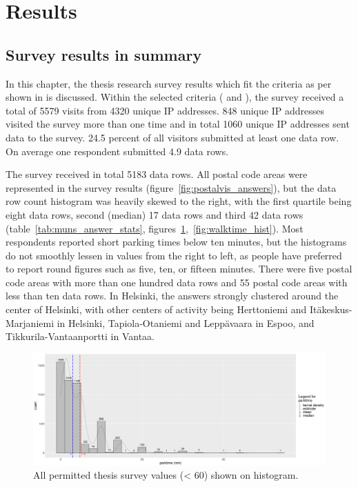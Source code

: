 \section{Results}
\subsection{Survey results in summary}
\justify

In this chapter, the thesis research survey results which fit the criteria as per shown in \hyperref[sec:processdata]{} is discussed. Within the selected criteria ( and ), the survey received a total of 5579 visits from 4320 unique IP addresses. 848 unique IP addresses visited the survey more than one time and in total 1060 unique IP addresses sent data to the survey. 24.5 percent of all visitors submitted at least one data row. On average one respondent submitted 4.9 data rows.

The survey received in total 5183 data rows. All postal code areas were represented in the survey results (figure~\ref{fig:postalvis_answers}), but the data row count histogram was heavily skewed to the right, with the first quartile being eight data rows, second (median) 17 data rows and third 42 data rows (table~\ref{tab:muns_answer_stats}, figures~\ref{fig:parktime_hist},~\ref{fig:walktime_hist}). Most respondents reported short parking times below ten minutes, but the histograms do not smoothly lessen in values from the right to left, as people have preferred to report round figures such as five, ten, or fifteen minutes. There were five postal code areas with more than one hundred data rows and 55 postal code areas with less than ten data rows. In Helsinki, the answers strongly clustered around the center of Helsinki, with other centers of activity being Herttoniemi and Itäkeskus-Marjaniemi in Helsinki, Tapiola-Otaniemi and Leppävaara in Espoo, and Tikkurila-Vantaanportti in Vantaa.

\begin{figure}[H]%
    \centering
    \includegraphics[width=\textwidth]{images/hist_pmax59-wmax59_parktime-likert_binw2_02-08-2020.png}
    \caption[Histogram, searching for parking]{All permitted thesis survey  values (< 60) shown on histogram.}%
    \label{fig:parktime_hist}%
\end{figure}

